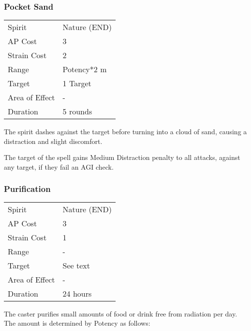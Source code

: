 \documentclass[11pt,a4paper,twocolumn]{book}
\begin{document}
\subsubsection*{Pocket Sand}
{
	\begin{tabu} to 75mm{| X[l,4] | X[l,7] |}
		\hline
		Spirit         & Nature (END) \\
		AP Cost        & 3            \\
		Strain Cost    & 2            \\
		Range          & Potency*2 m  \\
		Target         & 1 Target     \\
		Area of Effect & -            \\
		Duration       & 5 rounds     \\ \hline
	\end{tabu}
	
}

\medskip

The spirit dashes against the target before turning into a cloud of sand, causing a distraction and slight discomfort.

The target of the spell gains Medium Distraction penalty to all attacks, against any target, if they fail an AGI check.

\subsubsection*{Purification}
{
	\begin{tabu} to 70mm{| X[l,4] | X[l,7] |}
		\hline
		Spirit         & Nature (END) \\
		AP Cost        & 3            \\
		Strain Cost    & 1            \\
		Range          & -            \\
		Target         & See text     \\
		Area of Effect & -            \\
		Duration       & 24 hours     \\ \hline
	\end{tabu}
	
}
\medskip

The caster purifies small amounts of food or drink free from radiation per day. The amount is determined by Potency as follows:
\end{document}
